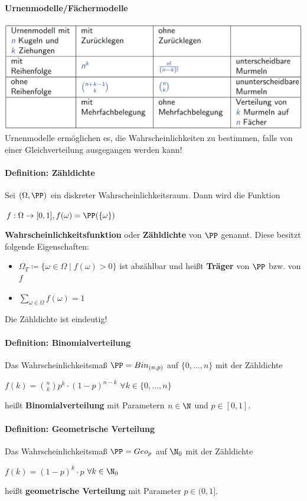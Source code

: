 \paragraph{Urnenmodelle/Fächermodelle}
\includegraphics[width=\textwidth]{images/image1.png}
Urnenmodelle ermöglichen es, die Wahrscheinlichkeiten zu bestimmen, falls von einer Gleichverteilung ausgegangen
werden kann!

\paragraph{Definition: Zähldichte}
Sei $(\Omega,\PP)$ ein diskreter Wahrscheinlichkeitsraum.
Dann wird die Funktion
\begin{tightcenter}
	$f:\Omega\rightarrow[0,1], f(\omega)=\PP(\{\omega\})$
\end{tightcenter}
\textbf{Wahrscheinlichkeitsfunktion} oder \textbf{Zähldichte} von $\PP$ genannt.
\newpage
Diese besitzt folgende Eigenschaften:
\begin{itemize}
	\item $\Omega_T\coloneqq\{\omega\in\Omega\mid f(\omega)>0\}$ ist abzählbar und heißt \textbf{Träger} von $\PP$ bzw. von $f$
	\item $\sum\limits_{\omega\in\Omega}f(\omega)=1$
\end{itemize}
Die Zähldichte ist eindeutig!

\paragraph{Definition: Binomialverteilung}
Das Wahrscheinlichkeitsmaß $\PP=Bin_{(n,p)}$ auf $\{0,\ldots,n\}$ mit der Zähldichte
\begin{tightcenter}
	$f(k)=\binom{n}{k}p^k\cdot(1-p)^{n-k}$ \qquad$\forall k\in\{0,\ldots,n\}$
\end{tightcenter}
heißt \textbf{Binomialverteilung} mit Parametern $n\in\N$ und $p\in[0,1]$.

\paragraph{Definition: Geometrische Verteilung}
Das Wahrscheinlichkeitsmaß $\PP=Geo_p$ auf $\N_0$ mit der Zähldichte
\begin{tightcenter}
	$f(k)=(1-p)^k\cdot p$ \qquad$\forall k\in\N_0$
\end{tightcenter}
heißt \textbf{geometrische Verteilung} mit Parameter $p\in(0,1]$.
